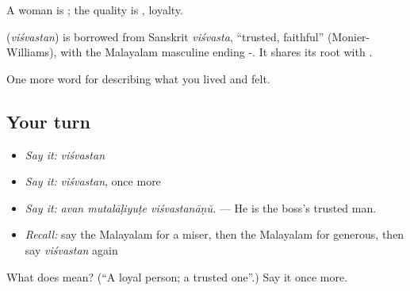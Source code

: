 A woman is ; the quality is , loyalty.

\begin{cousinweb}
\textbf{} (\emph{viśvastan}) is borrowed from Sanskrit \emph{viśvasta}, \textquotedblleft{}trusted, faithful\textquotedblright{} (Monier-Williams), with the Malayalam masculine ending -. It shares its root with .
\end{cousinweb}

\begin{grammarlens}[title={What you've built}]
One more word for describing what you lived and felt.
\end{grammarlens}

\subsection*{Your turn}
\begin{itemize}
\raggedright
  \item \emph{Say it:} \emph{viśvastan}
  \item \emph{Say it:} \emph{viśvastan}, once more
  \item \emph{Say it:} \emph{avan mutalāḷiyuṭe viśvastanāṇŭ.} — He is the boss's trusted man.
  \item \emph{Recall:} say the Malayalam for a miser, then the Malayalam for generous, then say \emph{viśvastan} again
\end{itemize}

\begin{tcolorbox}[breakable,colback=teal!4,colframe=teal!35!black,title={Before you move on}]
What does  mean? (\textquotedblleft{}A loyal person; a trusted one\textquotedblright{}.) Say it once more.
\end{tcolorbox}
